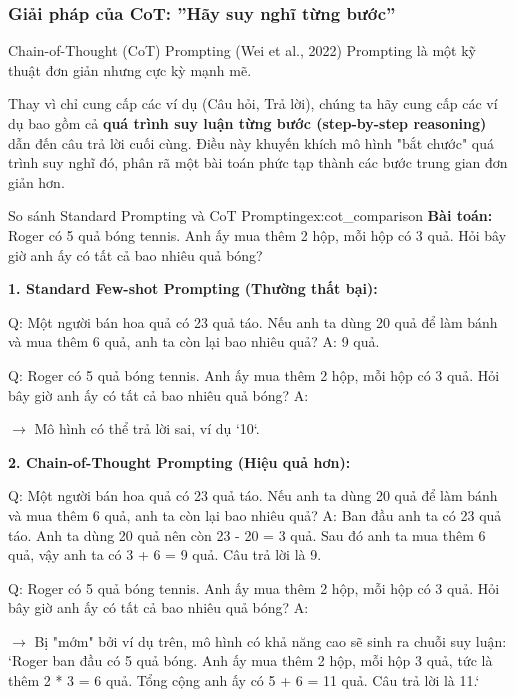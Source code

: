 \subsubsection{Giải pháp của CoT: ''Hãy suy nghĩ từng bước''}
Chain-of-Thought (CoT) Prompting (Wei et al., 2022) Prompting \cite{wei2022chain} là một kỹ thuật đơn giản nhưng cực kỳ mạnh mẽ.
\begin{tcolorbox}[
    title=Trực giác của Chain-of-Thought,
    colback=yellow!10!white, colframe=yellow!50!black, fonttitle=\bfseries
]
Thay vì chỉ cung cấp các ví dụ (Câu hỏi, Trả lời), chúng ta hãy cung cấp các ví dụ bao gồm cả \textbf{quá trình suy luận từng bước (step-by-step reasoning)} dẫn đến câu trả lời cuối cùng. Điều này khuyến khích mô hình "bắt chước" quá trình suy nghĩ đó, phân rã một bài toán phức tạp thành các bước trung gian đơn giản hơn.
\end{tcolorbox}

\begin{example}{So sánh Standard Prompting và CoT Prompting}{ex:cot_comparison}
    \textbf{Bài toán:} Roger có 5 quả bóng tennis. Anh ấy mua thêm 2 hộp, mỗi hộp có 3 quả. Hỏi bây giờ anh ấy có tất cả bao nhiêu quả bóng?
    
    \textbf{1. Standard Few-shot Prompting (Thường thất bại):}
    \begin{tcolorbox}[colback=red!5!white, colframe=red!60!black]
    Q: Một người bán hoa quả có 23 quả táo. Nếu anh ta dùng 20 quả để làm bánh và mua thêm 6 quả, anh ta còn lại bao nhiêu quả?
    A: 9 quả.
    
    Q: Roger có 5 quả bóng tennis. Anh ấy mua thêm 2 hộp, mỗi hộp có 3 quả. Hỏi bây giờ anh ấy có tất cả bao nhiêu quả bóng?
    A:
    \end{tcolorbox}
    \(\rightarrow\) Mô hình có thể trả lời sai, ví dụ `10`.

    \textbf{2. Chain-of-Thought Prompting (Hiệu quả hơn):}
    \begin{tcolorbox}[colback=green!5!white, colframe=green!60!black]
    Q: Một người bán hoa quả có 23 quả táo. Nếu anh ta dùng 20 quả để làm bánh và mua thêm 6 quả, anh ta còn lại bao nhiêu quả?
    A: Ban đầu anh ta có 23 quả táo. Anh ta dùng 20 quả nên còn 23 - 20 = 3 quả. Sau đó anh ta mua thêm 6 quả, vậy anh ta có 3 + 6 = 9 quả. Câu trả lời là 9.
    
    Q: Roger có 5 quả bóng tennis. Anh ấy mua thêm 2 hộp, mỗi hộp có 3 quả. Hỏi bây giờ anh ấy có tất cả bao nhiêu quả bóng?
    A:
    \end{tcolorbox}
    \(\rightarrow\) Bị "mớm" bởi ví dụ trên, mô hình có khả năng cao sẽ sinh ra chuỗi suy luận: `Roger ban đầu có 5 quả bóng. Anh ấy mua thêm 2 hộp, mỗi hộp 3 quả, tức là thêm 2 * 3 = 6 quả. Tổng cộng anh ấy có 5 + 6 = 11 quả. Câu trả lời là 11.`
\end{example}


